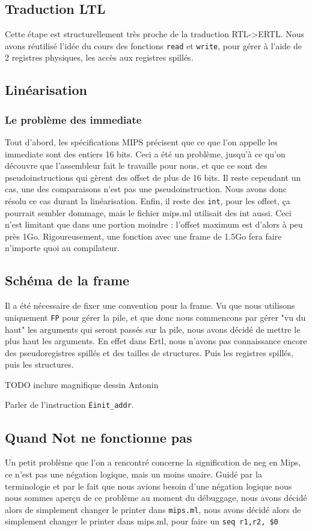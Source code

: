 \documentclass[a4paper]{article}
\begin{document}
\subsection{Traduction LTL}

Cette étape est structurellement très proche de la traduction RTL->ERTL.
Nous avons réutilisé l'idée du cours des fonctions \texttt{read} et
\texttt{write}, pour gérer à l'aide de 2 registres physiques,
les accès aux registres spillés. 

\subsection{Linéarisation}

\subsubsection{Le problème des immediate}
Tout d'abord, les spécifications MIPS précisent que ce que l'on appelle
les
 immediate sont des entiers 16 bits. Ceci a été un problème, jusqu'à ce
 qu'on découvre que l'assembleur fait le travaille pour nous, et que ce
 sont des pseudoinstructions qui gèrent des offset de plus de 16 bits.
 Il reste cependant un cas, une des comparaisons n'est pas une
 pseudoinstruction. Nous avons donc résolu ce cas durant la linéarisation.
Enfin, il reste des \texttt{int}, pour les offset, ça pourrait sembler
dommage, mais le fichier mips.ml utilisait des int aussi. Ceci
n'est limitant que dans une portion moindre : l'offset maximum est
d'alors à peu près 1Go. Rigoureusement, une fonction avec une frame de 1.5Go fera
faire n'importe quoi au compilateur.

\subsection{Schéma de la frame}

Il a été nécessaire de fixer une convention pour la frame. Vu que nous
utilisons uniquement \texttt{FP} pour gérer la pile, 
et que donc nous commencons par gérer "vu du haut"
les arguments qui seront passés sur la pile, nous avons décidé de mettre
le plus haut les arguments. En effet dans Ertl, nous n'avons pas
connaissance encore des pseudoregistres spillés et des tailles de
structures. Puis les registres spillés, puis les structures.
 
TODO inclure magnifique dessin Antonin

 Parler de l'instruction \texttt{Einit\_addr}.
\subsection{Quand Not ne fonctionne pas}
Un petit problème que l'on a rencontré concerne la signification de neg
en Mips, ce n'est pas une négation logique, mais un moins unaire. Guidé
par la terminologie et par le fait que nous avions besoin d'une négation
logique nous nous sommes aperçu de ce problème au moment du débuggage,
nous avons décidé alors de simplement changer le printer dans \texttt{mips.ml},
nous avons décidé alors de simplement changer le printer dans mips.ml,
pour faire un \texttt{seq r1,r2, \$0}
\end{document}
